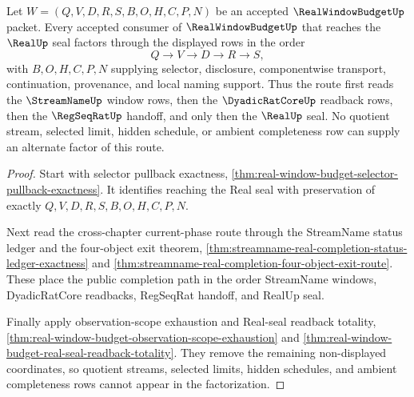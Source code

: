 \begin{theorem}
\label{thm:real-window-budget-streamname-regseqrat-factorization}
Let $W=(Q,V,D,R,S,B,O,H,C,P,N)$ be an accepted $\RealWindowBudgetUp$ packet.
Every accepted consumer of $\RealWindowBudgetUp$ that reaches the $\RealUp$
seal factors through the displayed rows in the order
$$
Q \to V \to D \to R \to S,
$$
with $B,O,H,C,P,N$ supplying selector, disclosure, componentwise transport,
continuation, provenance, and local naming support. Thus the route first reads
the $\StreamNameUp$ window rows, then the $\DyadicRatCoreUp$ readback rows,
then the $\RegSeqRatUp$ handoff, and only then the $\RealUp$ seal. No quotient
stream, selected limit, hidden schedule, or ambient completeness row can supply
an alternate factor of this route.
\end{theorem}
\begin{proof}
Start with selector pullback exactness,
\autoref{thm:real-window-budget-selector-pullback-exactness}. It identifies
reaching the Real seal with preservation of exactly
$Q,V,D,R,S,B,O,H,C,P,N$.

Next read the cross-chapter current-phase route through the StreamName status
ledger and the four-object exit theorem,
\autoref{thm:streamname-real-completion-status-ledger-exactness} and
\autoref{thm:streamname-real-completion-four-object-exit-route}. These place
the public completion path in the order StreamName windows, DyadicRatCore
readbacks, RegSeqRat handoff, and RealUp seal.

Finally apply observation-scope exhaustion and Real-seal readback totality,
\autoref{thm:real-window-budget-observation-scope-exhaustion} and
\autoref{thm:real-window-budget-real-seal-readback-totality}. They remove the
remaining non-displayed coordinates, so quotient streams, selected limits,
hidden schedules, and ambient completeness rows cannot appear in the
factorization.
\end{proof}

